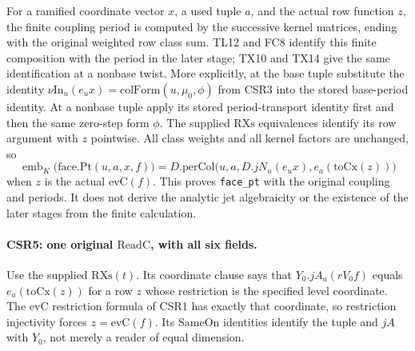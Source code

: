 For a ramified coordinate vector \(x\), a used tuple \(a\), and the
actual row function \(z\), the finite coupling period is computed
by the successive kernel matrices, ending with the original
weighted row class sum. TL12 and FC8 identify this finite
composition with the period in the later stage; TX10 and TX14
give the same identification at a nonbase twist. More explicitly,
at the base tuple substitute the identity
\(\nu\mathrm{In}_u(e_u x)=\mathrm{colForm}(u,\mu_0,\phi)\)
from CSR3 into the stored base-period identity. At a nonbase
tuple apply its stored period-transport identity first and then
the same zero-step form \(\phi\). The supplied \(\mathrm{RXs}\)
equivalences identify its row argument with \(z\) pointwise.
All class weights and all kernel factors are unchanged, so
\[
 \operatorname{emb}_{K}\bigl(\mathrm{face.Pt}(u,a,x,f)\bigr)
  =D.\mathrm{perCol}\bigl(u,a,D.jN_u(e_u x),e_a(\mathrm{toCx}(z))\bigr)
 \tag{CSR.11}
\]
when \(z\) is the actual \(\mathrm{evC}(f)\).
This proves \texttt{face\_pt} with the original coupling and
periods. It does not derive the analytic jet algebraicity or the
existence of the later stages from the finite calculation.

\paragraph{CSR5: one original \(\mathrm{ReadC}\), with all six fields.}
\label{claim:CSR5}
Use the supplied \(\mathrm{RXs}(t)\). Its coordinate clause says
that \(Y_0.jA_a(rV_0f)\) equals \(e_a(\mathrm{toCx}(z))\) for a
row \(z\) whose restriction is the specified level coordinate.
The \(\mathrm{evC}\) restriction formula of CSR1 has exactly that
coordinate, so restriction injectivity forces
\(z=\mathrm{evC}(f)\). Its \(\mathrm{SameOn}\) identities identify
the tuple and \(jA\) with \(Y_0\), not merely a reader of equal
dimension.

